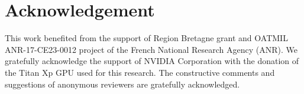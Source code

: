 \documentclass[runningheads]{llncs}
\begin{document}
\section*{Acknowledgement}
This work benefited from the support of Region Bretagne grant and  OATMIL ANR-17-CE23-0012 project of the French National Research Agency (ANR). We gratefully acknowledge the support of NVIDIA Corporation with the donation of the Titan Xp GPU used for this research. The constructive comments and suggestions of anonymous reviewers are gratefully acknowledged.




\end{document}
